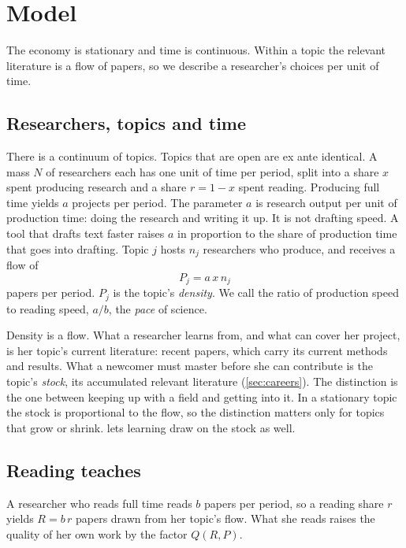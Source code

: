 \section{Model}\label{sec:model}

The economy is stationary and time is continuous. Within a topic the relevant
literature is a flow of papers, so we describe a researcher's choices per unit
of time.

\subsection{Researchers, topics and time}

There is a continuum of topics. Topics that are open are ex ante identical. A
mass $N$ of researchers each has one unit of time per period, split into a
share $x$ spent producing research and a share $r=1-x$ spent reading.
Producing full time yields $a$ projects per period. The parameter $a$ is
research output per unit of production time: doing the research and writing
it up. It is not drafting speed. A tool that drafts text faster raises $a$ in
proportion to the share of production time that goes into drafting. Topic $j$
hosts $n_j$ researchers who produce, and receives a flow of
\begin{equation}\label{eq:flow}
P_j = a\,x\,n_j
\end{equation}
papers per period. $P_j$ is the topic's \emph{density}. We call the ratio of
production speed to reading speed, $a/b$, the \emph{pace} of science.

Density is a flow. What a researcher learns from, and what can cover her
project, is her topic's current literature: recent papers, which carry its
current methods and results. What a newcomer must master before she can
contribute is the topic's \emph{stock}, its accumulated relevant literature
(\cref{sec:careers}). The distinction is the one between keeping up with a
field and getting into it. In a stationary topic the stock is proportional to
the flow, so the distinction matters only for topics that grow or shrink.
 lets learning draw on the stock as well.

\subsection{Reading teaches}

A researcher who reads full time reads $b$ papers per period, so a reading
share $r$ yields $R=b\,r$ papers drawn from her topic's flow. What she reads
raises the quality of her own work by the factor $Q(R,P)$.

